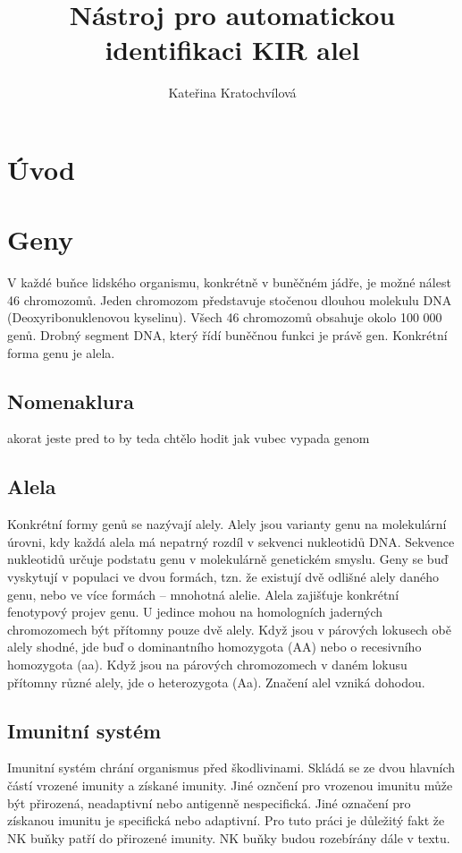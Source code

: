 \documentclass[czech,DP]{thesiskiv}
\author{Kateřina Kratochvílová}
\title{Nástroj pro automatickou identifikaci KIR alel}
\begin{document}
%
\maketitle
\tableofcontents

\chapter{Úvod}
\chapter{Geny}
V každé buňce lidského organismu, konkrétně v buněčném jádře, je možné nálest 46 chromozomů. Jeden chromozom představuje stočenou dlouhou molekulu DNA (Deoxyribonuklenovou kyselinu). Všech 46 chromozomů obsahuje okolo 100 000 genů. Drobný segment DNA, který řídí buněčnou funkci je právě gen. Konkrétní forma genu je alela. \citep{en_smith}
\section{Nomenaklura}
akorat jeste pred to by teda chtělo hodit jak vubec vypada genom

\section{Alela}
Konkrétní formy genů se nazývají alely.
Alely jsou varianty genu na molekulární úrovni, kdy každá alela má nepatrný rozdíl v sekvenci nukleotidů DNA. Sekvence nukleotidů určuje podstatu genu v molekulárně genetickém smyslu. Geny se buď vyskytují v populaci ve dvou formách, tzn. že existují dvě odlišné alely daného genu, nebo ve více formách – mnohotná alelie. Alela zajišťuje konkrétní fenotypový projev genu. U jedince mohou na homologních jaderných chromozomech být přítomny pouze dvě alely. Když jsou v párových lokusech obě alely shodné, jde buď o dominantního homozygota (AA) nebo o recesivního homozygota (aa). Když jsou na párových chromozomech v daném lokusu přítomny různé alely, jde o heterozygota (Aa). Značení alel vzniká dohodou.
\section{Imunitní systém}
Imunitní systém chrání organismus před škodlivinami. Skládá se ze dvou hlavních částí vrozené imunity a získané imunity. Jiné oznčení pro vrozenou imunitu může být přirozená, neadaptivní nebo antigenně nespecifická. Jiné označení pro získanou imunitu je specifická nebo adaptivní.
Pro tuto práci je důležitý fakt že NK buňky patří do přirozené imunity. NK buňky budou rozebírány dále v textu.
\end{document}
